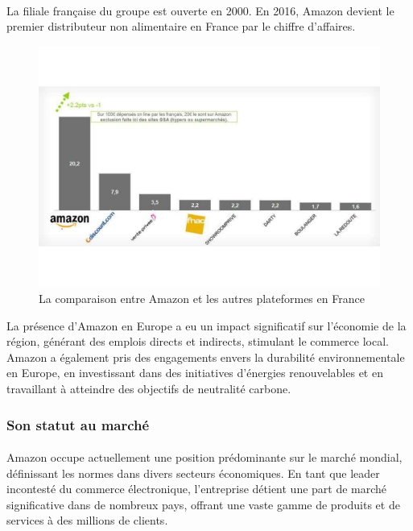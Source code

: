 \paragraph{}
\vspace{-2em}  %
La filiale française du groupe est ouverte en 2000. En 2016, Amazon devient le premier distributeur non alimentaire en France par le chiffre d'affaires.

\begin{figure}[htbp]
    \centering
    \includegraphics[width=0.8\linewidth]{./Graphismes-UTC/logos/Amazon/000315176_illustration_large.pdf}\hfill
    \caption{La comparaison entre Amazon et les autres plateformes en France}
\end{figure}
La présence d'Amazon en Europe a eu un impact significatif sur l'économie de la région, générant des emplois directs et indirects, stimulant le commerce local.
Amazon a également pris des engagements envers la durabilité environnementale en Europe, en investissant dans des initiatives d'énergies renouvelables et en travaillant à atteindre des objectifs de neutralité carbone.

\subsubsection{Son statut au marché}

\paragraph{}
\vspace{-2em}  %
Amazon occupe actuellement une position prédominante sur le marché mondial, définissant les normes dans divers secteurs économiques. En tant que leader incontesté du commerce électronique, l'entreprise détient une part de marché significative dans de nombreux pays, offrant une vaste gamme de produits et de services à des millions de clients. 


